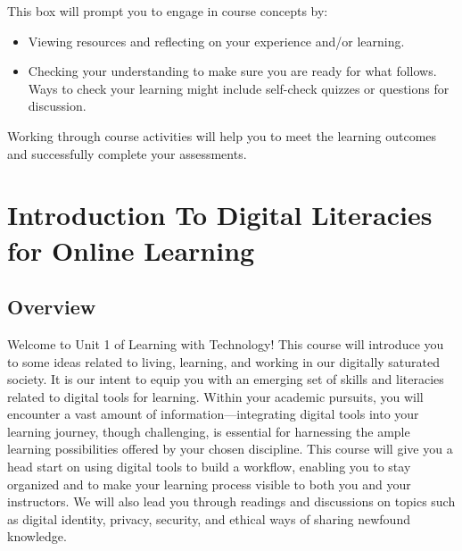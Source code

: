 \documentclass[
  letterpaper,
  DIV=11,
  numbers=noendperiod]{scrreprt}
\providecommand{\tightlist}{%
  \setlength{\itemsep}{0pt}\setlength{\parskip}{0pt}}\usepackage{longtable,booktabs,array}
\begin{document}
\begin{tcolorbox}[enhanced jigsaw, toprule=.15mm, colback=white, colframe=quarto-callout-note-color-frame, bottomtitle=1mm, leftrule=.75mm, coltitle=black, titlerule=0mm, rightrule=.15mm, colbacktitle=quarto-callout-note-color!10!white, left=2mm, title={Learning Activity}, opacitybacktitle=0.6, opacityback=0, breakable, toptitle=1mm, arc=.35mm, bottomrule=.15mm]

This box will prompt you to engage in course concepts by:

\begin{itemize}
\tightlist
\item
  Viewing resources and reflecting on your experience and/or learning.
\item
  Checking your understanding to make sure you are ready for what
  follows. Ways to check your learning might include self-check quizzes
  or questions for discussion.
\end{itemize}

\begin{tcolorbox}[enhanced jigsaw, toprule=.15mm, colback=white, colframe=quarto-callout-note-color-frame, arc=.35mm, opacityback=0, breakable, rightrule=.15mm, bottomrule=.15mm, leftrule=.75mm, left=2mm]

Working through course activities will help you to meet the learning
outcomes and successfully complete your assessments.

\end{tcolorbox}

\end{tcolorbox}


\chapter{Introduction To Digital Literacies for Online
Learning}\label{introduction-to-digital-literacies-for-online-learning}

\section*{Overview}\label{overview}


Welcome to Unit 1 of Learning with Technology! This course will
introduce you to some ideas related to living, learning, and working in
our digitally saturated society. It is our intent to equip you with an
emerging set of skills and literacies related to digital tools for
learning. Within your academic pursuits, you will encounter a vast
amount of information---integrating digital tools into your learning
journey, though challenging, is essential for harnessing the ample
learning possibilities offered by your chosen discipline. This course
will give you a head start on using digital tools to build a workflow,
enabling you to stay organized and to make your learning process visible
to both you and your instructors. We will also lead you through readings
and discussions on topics such as digital identity, privacy, security,
and ethical ways of sharing newfound knowledge.
\end{document}
